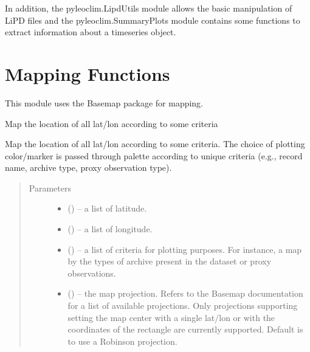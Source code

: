 \documentclass[letterpaper,10pt,english]{sphinxmanual}
\begin{document}
In addition, the pyleoclim.LipdUtils module allows the basic manipulation of LiPD files and the pyleoclim.SummaryPlots module
contains some functions to extract information about a timeseries object.


\chapter{Mapping Functions}
\label{\detokenize{Map:mapping-functions}}\label{\detokenize{Map::doc}}
This module uses the Basemap package for mapping.

\begin{fulllineitems}
\label{\detokenize{Map:pyleoclim.Map.mapAll}}
Map the location of all lat/lon according to some criteria

Map the location of all lat/lon according to some criteria. The choice of
plotting color/marker is passed through palette according to unique
criteria (e.g., record name, archive type, proxy observation type).
\begin{quote}\begin{description}
\item[{Parameters}] \leavevmode\begin{itemize}
\item {} 
 () -- a list of latitude.

\item {} 
 () -- a list of longitude.

\item {} 
 () -- a list of criteria for plotting purposes. For instance,
a map by the types of archive present in the dataset or proxy
observations.

\item {} 
 () -- the map projection. Refers to the Basemap
documentation for a list of available projections. Only projections
supporting setting the map center with a single lat/lon or with
the coordinates of the rectangle are currently supported.
Default is to use a Robinson projection.


\end{itemize}
\end{description}
\end{quote}
\end{fulllineitems}
\end{document}
